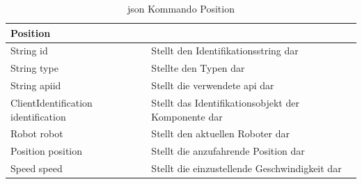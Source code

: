 \begin{table}[h]
	\centering
	\begin{tabular}{|p{4cm}|p{10cm}|}
		\hline
		\textbf{Position} & \\
		\hline
		String id & Stellt den Identifikationsstring dar \\
		String type & Stellte den Typen dar \\
		String apiid & Stellt die verwendete \gls{api} dar \\
		ClientIdentification identification & Stellt das Identifikationsobjekt der Komponente dar \\
		Robot robot & Stellt den aktuellen Roboter dar\\
		Position position &  Stellt die anzufahrende Position dar\\
		Speed speed & Stellt die einzustellende Geschwindigkeit dar\\
		\hline
	\end{tabular}
	\caption[\gls{json} Kommando Position]{\gls{json} Kommando Position}
	\label{tab:Position}
\end{table}